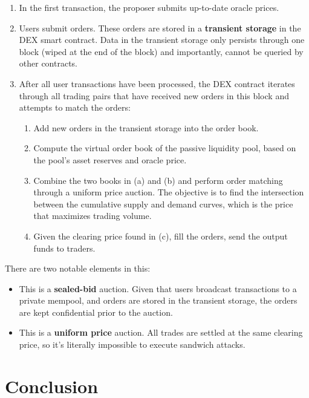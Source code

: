 \documentclass{article}
\begin{document}
\begin{enumerate}
  \item In the first transaction, the proposer submits up-to-date oracle prices.
  \item Users submit orders. These orders are stored in a \textbf{transient storage} in the DEX smart contract. Data in the transient storage only persists through one block (wiped at the end of the block) and importantly, cannot be queried by other contracts.
  \item After all user transactions have been processed, the DEX contract iterates through all trading pairs that have received new orders in this block and attempts to match the orders:
        \begin{enumerate}
          \item Add new orders in the transient storage into the order book.
          \item Compute the virtual order book of the passive liquidity pool, based on the pool's asset reserves and oracle price.
          \item Combine the two books in (a) and (b) and perform order matching through a uniform price auction.\supercite{uniformpriceauctions} The objective is to find the intersection between the cumulative supply and demand curves, which is the price that maximizes trading volume.
          \item Given the clearing price found in (c), fill the orders, send the output funds to traders.
        \end{enumerate}
\end{enumerate}

There are two notable elements in this:

\begin{itemize}
  \item This is a \textbf{sealed-bid} auction. Given that users broadcast transactions to a private mempool, and orders are stored in the transient storage, the orders are kept confidential prior to the auction.
  \item This is a \textbf{uniform price} auction. All trades are settled at the same clearing price, so it's literally impossible to execute sandwich attacks.
\end{itemize}

\section{Conclusion}
\end{document}
